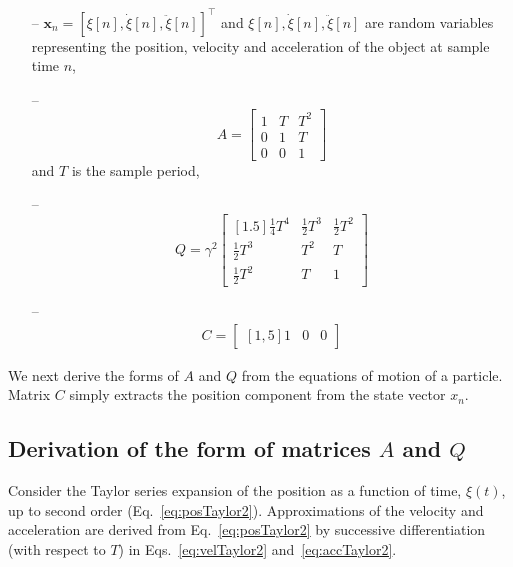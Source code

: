 \documentclass[fleqn]{article}
\begin{document}
\begin{itemize}

    \item[--]
        $\mathbf{x}_n=\left[\xi[n],\dot{\xi}[n],\ddot{\xi}[n]\right]^\intercal$
        and $\xi[n],\dot{\xi}[n],\ddot{\xi}[n]$ are random variables representing
        the position, velocity and acceleration of the object at sample time
        $n$,

    \item[--]
        \begin{equation}
            A=\begin{bmatrix}
                1 & T & T^2\\
                0 & 1 & T\\
                0 & 0 & 1
            \end{bmatrix}
            \label{eq:A}
        \end{equation}
        and $T$ is the sample period,

    \item[--]
        \begin{equation}
            Q=\gamma^2\begin{bmatrix}[1.5]
                \frac{1}{4}T^4&\frac{1}{2}T^3&\frac{1}{2}T^2\\
                \frac{1}{2}T^3&T^2&T\\
                \frac{1}{2}T^2&T&1
            \end{bmatrix}
            \label{eq:Q}
        \end{equation}

    \item[--]
        \begin{align*}
            C=\begin{bmatrix}[1,5]
                1 & 0 &0
            \end{bmatrix}
        \end{align*}
\end{itemize}

We next derive the forms of $A$ and $Q$ from the equations of motion of a
particle. Matrix $C$ simply extracts the position component from the state
vector $x_n$.

\subsection*{Derivation of the form of matrices $A$ and $Q$}

Consider the Taylor series expansion of the position as a function of time,
$\xi(t)$, up to second order (Eq.~\ref{eq:posTaylor2}). Approximations of the
velocity and acceleration are derived from Eq.~\ref{eq:posTaylor2} by
successive differentiation (with respect to $T$) in Eqs.~\ref{eq:velTaylor2}
and~\ref{eq:accTaylor2}.
\end{document}
